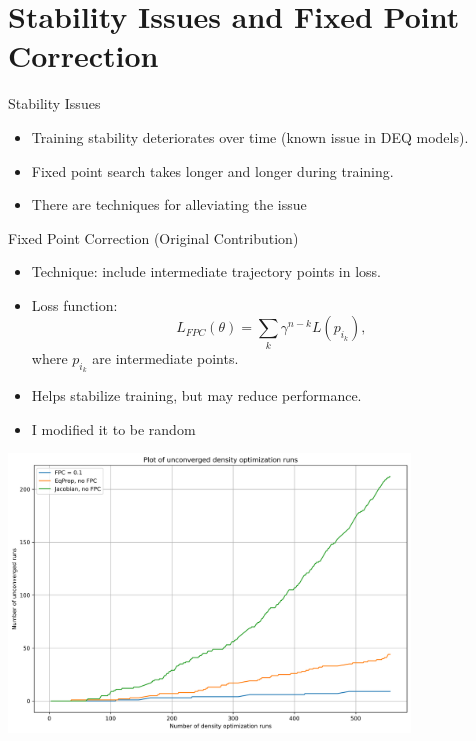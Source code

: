 \documentclass{beamer}
\begin{document}
\section{Stability Issues and Fixed Point Correction}
\begin{frame}{Stability Issues}
  \begin{itemize}
    \item Training stability deteriorates over time (known issue in DEQ models).
    \item Fixed point search takes longer and longer during training.
    \item There are techniques for alleviating the issue
  \end{itemize}
\end{frame}

\begin{frame}{Fixed Point Correction (Original Contribution)}
  \begin{itemize}
    \item Technique: include intermediate trajectory points in loss.
    \item Loss function:
    \[
      L_{FPC}(\theta) = \sum_{k} \gamma^{n-k} L(p_{i_k}),
    \]
    where $p_{i_k}$ are intermediate points.
    \item Helps stabilize training, but may reduce performance.
    \item I modified it to be random
  \end{itemize}

\end{frame}

\begin{frame}
   \begin{center}
    \includegraphics[width=0.8\textwidth]{images/stability_plot.png} %
  \end{center}
\end{frame}
\end{document}
